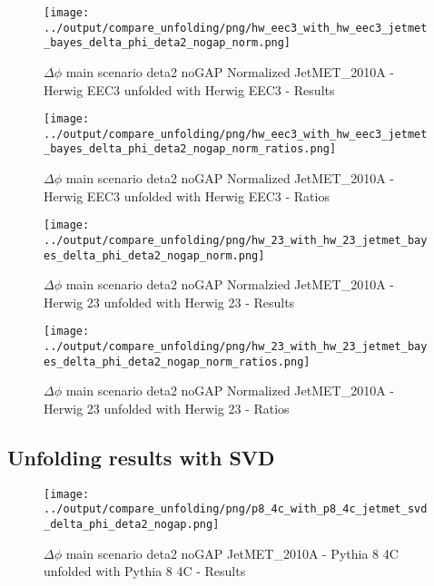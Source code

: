 \documentclass[11pt]{book}
\begin{document}
\begin{figure}[ht]
\centering
\texttt{[image: ../output/compare\_unfolding/png/hw\_eec3\_with\_hw\_eec3\_jetmet\_bayes\_delta\_phi\_deta2\_nogap\_norm.png]}
\caption{$\Delta\phi$ main scenario deta2 noGAP Normalized JetMET\_2010A - Herwig EEC3 unfolded with Herwig EEC3 - Results}
\label{hw_eec3_hw_eec3_jetmet_bayes_delta_phi_deta2_nogap_norm_a}
\end{figure}

\begin{figure}[ht]
\centering
\texttt{[image: ../output/compare\_unfolding/png/hw\_eec3\_with\_hw\_eec3\_jetmet\_bayes\_delta\_phi\_deta2\_nogap\_norm\_ratios.png]}
\caption{$\Delta\phi$ main scenario deta2 noGAP Normalized JetMET\_2010A - Herwig EEC3 unfolded with Herwig EEC3 - Ratios}
\label{hw_eec3_hw_eec3_jetmet_bayes_delta_phi_deta2_nogap_norm_b}
\end{figure}

\begin{figure}[ht]
\centering
\texttt{[image: ../output/compare\_unfolding/png/hw\_23\_with\_hw\_23\_jetmet\_bayes\_delta\_phi\_deta2\_nogap\_norm.png]}
\caption{$\Delta\phi$ main scenario deta2 noGAP Normalzied JetMET\_2010A - Herwig 23 unfolded with Herwig 23 - Results}
\label{hw_23_hw_23_jetmet_bayes_delta_phi_deta2_nogap_norm_a}
\end{figure}

\begin{figure}[ht]
\centering
\texttt{[image: ../output/compare\_unfolding/png/hw\_23\_with\_hw\_23\_jetmet\_bayes\_delta\_phi\_deta2\_nogap\_norm\_ratios.png]}
\caption{$\Delta\phi$ main scenario deta2 noGAP Normalized JetMET\_2010A - Herwig 23 unfolded with Herwig 23 - Ratios}
\label{hw_23_hw_23_jetmet_bayes_delta_phi_deta2_nogap_norm_b}
\end{figure}


\clearpage
\subsection{Unfolding results with SVD}

\begin{figure}[ht]
\centering
\texttt{[image: ../output/compare\_unfolding/png/p8\_4c\_with\_p8\_4c\_jetmet\_svd\_delta\_phi\_deta2\_nogap.png]}
\caption{$\Delta\phi$ main scenario deta2 noGAP JetMET\_2010A - Pythia 8 4C unfolded with Pythia 8 4C - Results}
\label{p8_p8_jetmet_svd_delta_phi_deta2_nogap_a}
\end{figure}
\end{document}
